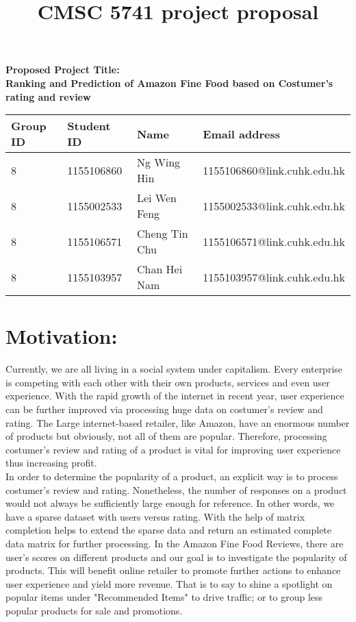 \documentclass[12pt]{article}
\title{CMSC 5741 project proposal}
\date{}
\begin{document}
  \maketitle
\textbf{Proposed Project Title:}\\

\textbf{Ranking and Prediction of Amazon Fine Food based on Costumer's rating and review}
\\

\begin{center}
    \begin{tabular}{| l | l | l | l |}
    \hline
    Group ID & Student ID & Name & Email address \\ \hline
    8 & 1155106860 & Ng Wing Hin & 1155106860@link.cuhk.edu.hk  \\ \hline
    8 & 1155002533 & Lei Wen Feng & 1155002533@link.cuhk.edu.hk  \\ \hline
    8 & 1155106571 & Cheng Tin Chu & 1155106571@link.cuhk.edu.hk  \\ \hline
    8 & 1155103957 & Chan Hei Nam & 1155103957@link.cuhk.edu.hk  \\ \hline
    
    \end{tabular}
\end{center}

\section{Motivation:}
Currently, we are all living in a social system under capitalism. Every enterprise is competing with each other with their own products, services and even user experience. With the rapid growth of the internet in recent year, user experience can be further improved via processing huge data on costumer's review and rating. The Large internet-based retailer, like Amazon, have an enormous number of products but obviously, not all of them are popular. Therefore, processing costumer's review and rating of a product is vital for improving user experience thus increasing profit.\\

In order to determine the popularity of a product, an explicit way is to process costumer's review and rating. Nonetheless, the number of responses on a product would not always be sufficiently large enough for reference. In other words, we have a sparse dataset with users versus rating. With the help of matrix completion helps to extend the sparse data and return an estimated complete data matrix for further processing. In the Amazon Fine Food Reviews, there are user's scores on different products and our goal is to investigate the popularity of products. This will benefit online retailer to promote further actions to enhance user experience and yield more revenue. That is to say to shine a spotlight on popular items under "Recommended Items" to drive traffic; or to group less popular products for sale and promotions.
\end{document}
